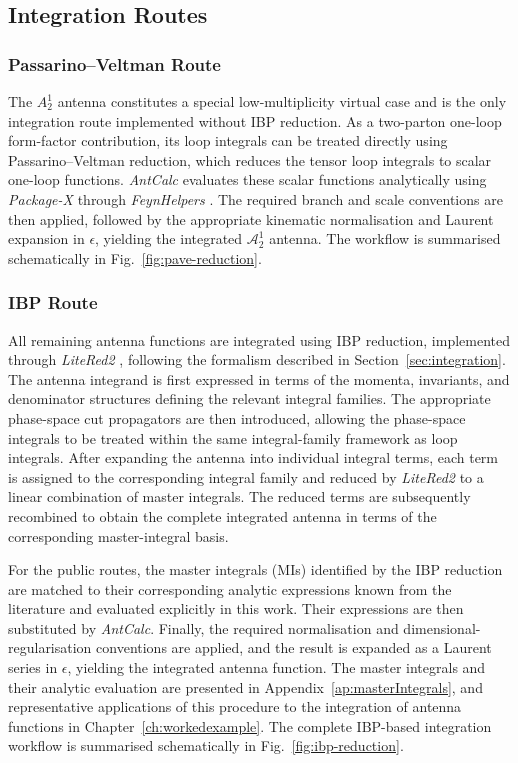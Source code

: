 \subsection{Integration Routes}

\subsubsection{Passarino--Veltman Route}

The $A_2^1$ antenna constitutes a special low-multiplicity virtual case and is the only
integration route implemented without IBP reduction. As a two-parton one-loop form-factor
contribution, its loop integrals can be treated directly using Passarino--Veltman reduction,
which reduces the tensor loop integrals to scalar one-loop functions. \textit{AntCalc}
evaluates these scalar functions analytically using \textit{Package-X} \cite{PackageX} through
\textit{FeynHelpers} \cite{FeynHelpers}. The required branch and scale conventions are then
applied, followed by the appropriate kinematic normalisation and Laurent expansion in
$\epsilon$, yielding the integrated $\mathcal A_2^1$ antenna. The workflow is summarised
schematically in Fig.~\ref{fig:pave-reduction}.



\subsubsection{IBP Route}

All remaining antenna functions are integrated using IBP reduction, implemented through
\textit{LiteRed2} \cite{Litered}, following the formalism described in
Section~\ref{sec:integration}. The antenna integrand is first expressed in terms of the
momenta, invariants, and denominator structures defining the relevant integral families. The
appropriate phase-space cut propagators are then introduced, allowing the phase-space integrals
to be treated within the same integral-family framework as loop integrals. After expanding the
antenna into individual integral terms, each term is assigned to the corresponding integral
family and reduced by \textit{LiteRed2} to a linear combination of master integrals. The
reduced terms are subsequently recombined to obtain the complete integrated antenna in terms of
the corresponding master-integral basis.

For the public routes, the master integrals (MIs) identified by the IBP reduction are matched
to their corresponding analytic expressions known from the literature and evaluated explicitly
in this work. Their expressions are then substituted by \textit{AntCalc}. Finally, the required
normalisation and dimensional-regularisation conventions are applied, and the result is
expanded as a Laurent series in $\epsilon$, yielding the integrated antenna function. The master
integrals and their analytic evaluation are presented in Appendix~\ref{ap:masterIntegrals}, and
representative applications of this procedure to the integration of antenna functions in
Chapter~\ref{ch:workedexample}. The complete IBP-based integration workflow is summarised
schematically in Fig.~\ref{fig:ibp-reduction}.

